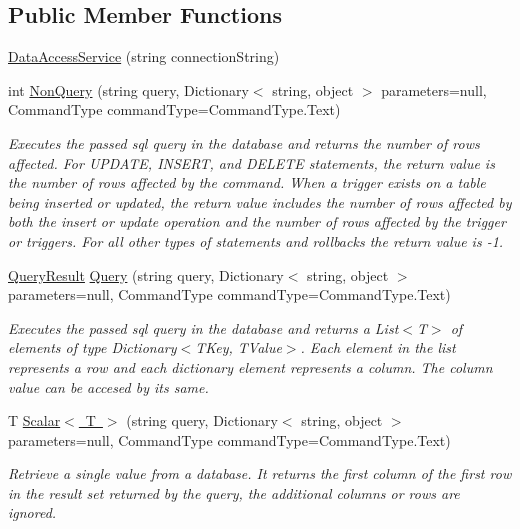 \subsection*{Public Member Functions}
\begin{DoxyCompactItemize}
\item 
\mbox{\hyperlink{classDataBaseAccess_1_1DataAccessService_a1a8ce18984787ddbb8ecf1aa0a71b003}{Data\+Access\+Service}} (string connection\+String)
\item 
int \mbox{\hyperlink{classDataBaseAccess_1_1DataAccessService_ac0ccfab11b8a047d85096cdf188e8e2f}{Non\+Query}} (string query, Dictionary$<$ string, object $>$ parameters=null, Command\+Type command\+Type=Command\+Type.\+Text)
\begin{DoxyCompactList}\small\item\em Executes the passed sql query in the database and returns the number of rows affected. For U\+P\+D\+A\+TE, I\+N\+S\+E\+RT, and D\+E\+L\+E\+TE statements, the return value is the number of rows affected by the command. When a trigger exists on a table being inserted or updated, the return value includes the number of rows affected by both the insert or update operation and the number of rows affected by the trigger or triggers. For all other types of statements and rollbacks the return value is -\/1. \end{DoxyCompactList}\item 
\mbox{\hyperlink{classDataBaseAccess_1_1QueryResult}{Query\+Result}} \mbox{\hyperlink{classDataBaseAccess_1_1DataAccessService_a0a2cbe1a4d93a5d946e4ccdb8ac11523}{Query}} (string query, Dictionary$<$ string, object $>$ parameters=null, Command\+Type command\+Type=Command\+Type.\+Text)
\begin{DoxyCompactList}\small\item\em Executes the passed sql query in the database and returns a List$<$\+T$>$ of elements of type Dictionary$<$\+T\+Key, T\+Value$>$. Each element in the list represents a row and each dictionary element represents a column. The column value can be accesed by its same. \end{DoxyCompactList}\item 
T \mbox{\hyperlink{classDataBaseAccess_1_1DataAccessService_a422e6ead446da4cfcdc33255193ac92e}{Scalar$<$ T $>$}} (string query, Dictionary$<$ string, object $>$ parameters=null, Command\+Type command\+Type=Command\+Type.\+Text)
\begin{DoxyCompactList}\small\item\em Retrieve a single value from a database. It returns the first column of the first row in the result set returned by the query, the additional columns or rows are ignored. \end{DoxyCompactList}\item 

\end{DoxyCompactItemize}
